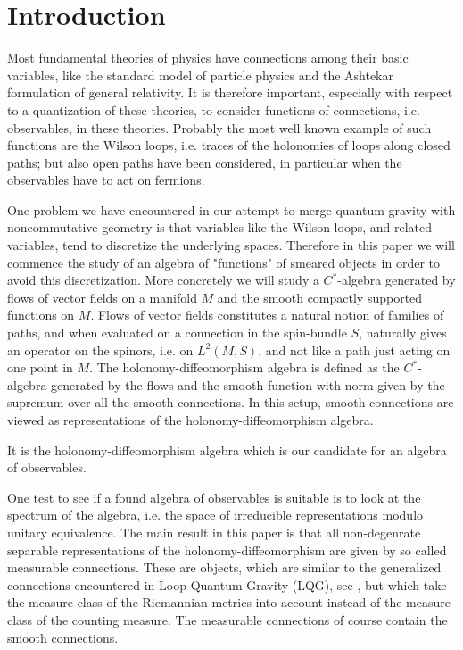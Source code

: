 \documentclass[12pt]{article}
\begin{document}
\newpage
\tableofcontents
\newpage

\section{Introduction}

Most fundamental theories of physics have connections among their basic variables,  like the standard model of particle physics and the Ashtekar formulation of general relativity. It is therefore important, especially with respect to a quantization of these theories, to consider functions of connections, i.e. observables, in these theories. Probably the most well known example of such functions are the Wilson loops, i.e. traces of the holonomies of loops along closed paths; but also open paths have been considered, in particular when the observables have to act on fermions.

One problem we have encountered in our attempt  \cite{AastrupGrimstruprew} to merge quantum gravity with noncommutative geometry  is that variables like the Wilson loops, and related variables, tend to discretize the underlying spaces. Therefore in this paper we will commence the study of an algebra of "functions" of smeared objects in order to avoid this discretization. More concretely we will study a $C^*$-algebra generated by flows of vector fields on a manifold $M$ and the smooth compactly supported functions on $M$. Flows of vector fields constitutes a natural notion of families of paths, and when evaluated on a connection in the spin-bundle $S$, naturally gives an operator on the spinors, i.e. on $L^2(M,S)$, and not like a path just acting on one point in $M$. The holonomy-diffeomorphism algebra is defined as the $C^*$-algebra generated by the flows and the smooth function with norm given by the supremum over all the smooth connections.   In this setup, smooth connections are viewed as representations of the holonomy-diffeomorphism algebra.      

It is the holonomy-diffeomorphism algebra which is our candidate for an algebra of observables.

One test to see if a found algebra of observables is suitable is to look at the spectrum of the algebra, i.e. the space of irreducible representations modulo unitary equivalence.
The main result in this paper is that all non-degenrate separable representations of the holonomy-diffeomorphism are given by  so called measurable connections. These are objects, which are similar to the generalized connections encountered in Loop Quantum Gravity (LQG), see \cite{AshtekarLewandowski}, but which take the measure class of the Riemannian metrics into account instead of the measure class of the counting measure.  The measurable  connections of course contain the smooth connections. 
\end{document}
